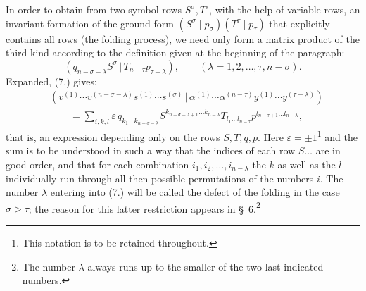 \documentclass[11pt]{article}
\newcommand{\pair}[2]{(#1\,|\,#2)}
\newcommand{\eps}{\varepsilon}
\begin{document}
In order to obtain from two symbol rows $S^\sigma,T^\tau$, with the help of variable rows, an invariant formation of the ground form $(S^\sigma\mid p_\sigma)(T^\tau\mid p_\tau)$ that explicitly contains all rows (the folding process), we need only form a matrix product of the third kind according to the definition given at the beginning of the paragraph:
\begin{equation}
 \pair{q_{n-\sigma-\lambda}S^\sigma}{T_{n-\tau}p_{\tau-\lambda}},
 \qquad (\lambda=1,2,\ldots,\tau,n-\sigma).
\tag{7}
\end{equation}
Expanded, (7.) gives:
\begin{equation}
\begin{aligned}
&\pair{v^{(1)}\cdots v^{(n-\sigma-\lambda)}s^{(1)}\cdots s^{(\sigma)}}
       {\alpha^{(1)}\cdots\alpha^{(n-\tau)}y^{(1)}\cdots y^{(\tau-\lambda)}} \\
&\qquad =\sum_{i,k,l}\eps\,q_{k_1\ldots k_{n-\sigma-\lambda}}
 S^{k_{n-\sigma-\lambda+1}\ldots k_{n-\lambda}}
 T_{l_1\ldots l_{n-\tau}}
 p^{l_{n-\tau+1}\ldots l_{n-\lambda}},
\end{aligned}
\tag{8}
\end{equation}
that is, an expression depending only on the rows $S,T,q,p$. Here $\eps=\pm1$\footnote{This notation is to be retained throughout.} and the sum is to be understood in such a way that the indices of each row $S\ldots$ are in good order, and that for each combination $i_1,i_2,\ldots,i_{n-\lambda}$ the $k$ as well as the $l$ individually run through all then possible permutations of the numbers $i$. The number $\lambda$ entering into (7.) will be called the defect of the folding in the case $\sigma>\tau$; the reason for this latter restriction appears in \S\ 6.\footnote{The number $\lambda$ always runs up to the smaller of the two last indicated numbers.}
\end{document}
